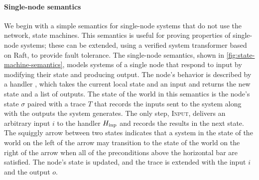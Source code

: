 \paragraph{Single-node semantics} We begin with a simple semantics for
single-node systems that do not use the network, \ie state machines.
%
This semantics is useful for proving properties of single-node systems;
these can be extended, using a verified system transformer based on Raft,
to provide fault tolerance.
%
The single-node semantics, shown in \cref{fig:state-machine-semantics},
models systems of a single node that respond to input by modifying their
state and producing output.
%
The node's behavior is described by a handler \fHinp, which takes the current
local state and an input and returns the new state and a list of outputs.
%
The state of the world in this semantics is the node's state $\sigma$
paired with a trace $T$ that records the inputs sent to the system along
with the outputs the system generates.
%
The only step, \textsc{Input}, delivers an arbitrary input $i$ to the
handler $H_{\mathrm{inp}}$ and records the results in the next state.
%
The squiggly arrow between two states indicates that a system in the
state of the world on the left of the arrow may transition to the
state of the world on the right of the arrow when all of the
preconditions above the horizontal bar are satisfied. The node's state
is updated, and the trace is extended with the input $i$ and the
output $o$.

